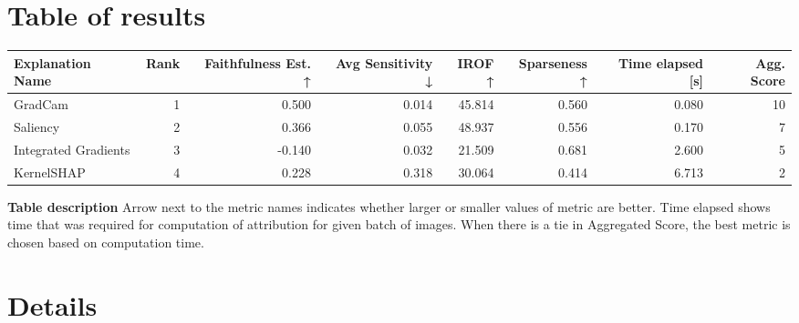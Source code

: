 \documentclass{article}%
\begin{document}
\section*{Table of results}%
\label{sec:Tableofresults}%
\begin{footnotesize}%
\begin{flushleft} %
\begin{tabular}{lrrrrrrr}
\toprule
    Explanation Name &  Rank &  Faithfulness Est. ↑ &  Avg Sensitivity ↓ &  IROF ↑ &  Sparseness ↑ &  Time elapsed [s] &  Agg. Score \\
\midrule
             GradCam &     1 &                0.500 &              0.014 &  45.814 &         0.560 &             0.080 &          10 \\
            Saliency &     2 &                0.366 &              0.055 &  48.937 &         0.556 &             0.170 &           7 \\
Integrated Gradients &     3 &               -0.140 &              0.032 &  21.509 &         0.681 &             2.600 &           5 \\
          KernelSHAP &     4 &                0.228 &              0.318 &  30.064 &         0.414 &             6.713 &           2 \\
\bottomrule
\end{tabular}
%
\end{flushleft}%
\end{footnotesize}%
\textbf{Table description \newline%
}%
Arrow next to the metric names indicates whether larger or smaller values of metric are better. Time elapsed shows time that was required for computation of attribution for given batch of images. When there is a tie in Aggregated Score, the best metric is chosen based on computation time.

%
\newpage%
\section*{Details}%
\label{sec:Details}%
\end{document}
